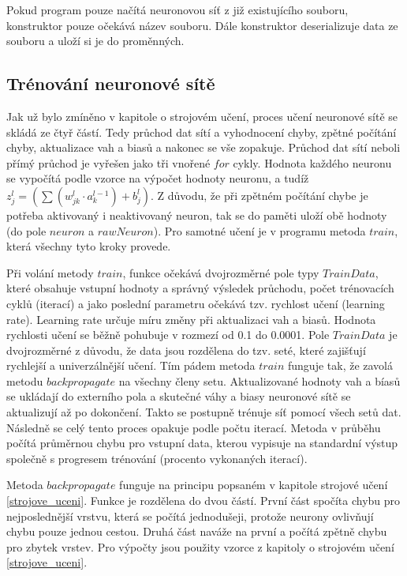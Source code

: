 Pokud program pouze načítá neuronovou síť z již existujícího souboru, konstruktor pouze očekává název souboru.
Dále konstruktor deserializuje data ze souboru a uloží si je do proměnných.

\subsection{Trénování neuronové sítě}
Jak už bylo zmíněno v kapitole o strojovém učení, proces učení neuronové sítě se skládá ze čtyř částí. Tedy průchod dat sítí a vyhodnocení chyby,
zpětné počítání chyby, aktualizace vah a biasů a nakonec se vše zopakuje. Průchod dat sítí neboli přímý průchod je vyřešen jako tři vnořené \(for\) cykly.
Hodnota každého neuronu se vypočítá podle vzorce na výpočet hodnoty neuronu, a tudíž \(z_{j}^{l} = \left( \sum (w^{l}_{jk} \cdot a^{l-1}_k) + b^l_j \right)\).
Z důvodu, že při zpětném počítání chybe je potřeba aktivovaný i neaktivovaný neuron, tak se do paměti uloží obě hodnoty (do pole \(neuron\) a \(rawNeuron\)).
Pro samotné učení je v programu metoda \(train\), která všechny tyto kroky provede.

Při volání metody \(train\), funkce očekává dvojrozměrné pole typy \(TrainData\), které obsahuje vstupní hodnoty a správný výsledek průchodu,
počet trénovacích cyklů (iterací) a jako poslední parametru očekává tzv. rychlost učení (learning rate).
Learning rate určuje míru změny při aktualizaci vah a biasů. Hodnota rychlosti učení se běžně pohubuje v rozmezí od 0.1 do 0.0001.
Pole \(TrainData\) je dvojrozměrné z důvodu, že data jsou rozdělena do tzv. seté, které zajišťují rychlejší a univerzálnější učení.
Tím pádem metoda \(train\) funguje tak, že zavolá metodu \(backpropagate\) na všechny členy setu.
Aktualizované hodnoty vah a bíasů se ukládají do externího pola a skutečné váhy a biasy neuronové sítě se aktualizují až po dokončení.
Takto se postupně trénuje síť pomocí všech setů dat. Následně se celý tento proces opakuje podle počtu iterací.
Metoda v průběhu počítá průměrnou chybu pro vstupní data, kterou vypisuje na standardní výstup společně s progresem trénování (procento vykonaných iterací).

Metoda \(backpropagate\) funguje na principu popsaném v kapitole strojové učení \ref{strojove_uceni}. Funkce je rozdělena do dvou částí.
První část spočíta chybu pro nejposlednější vrstvu, která se počítá jednodušeji, protože neurony ovlivňují chybu pouze jednou cestou.
Druhá část naváže na první a počítá zpětně chybu pro zbytek vrstev. Pro výpočty jsou použity vzorce z kapitoly o strojovém učení \ref{strojove_uceni}.


